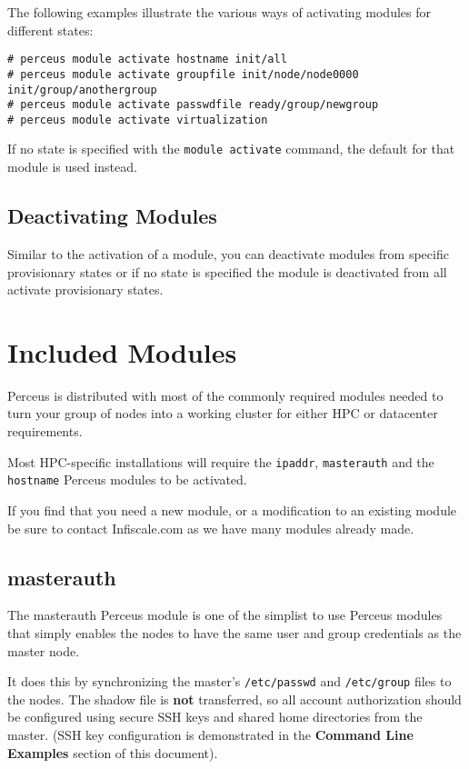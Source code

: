 \documentclass[10pt,letterpaper]{report}
\begin{document}
The following examples illustrate the various ways of activating modules for
different states:

\begin{verbatim}
# perceus module activate hostname init/all
# perceus module activate groupfile init/node/node0000 init/group/anothergroup
# perceus module activate passwdfile ready/group/newgroup
# perceus module activate virtualization
\end{verbatim}

If no state is specified with the {\tt module activate} command, the default
for that module is used instead.

\subsection{Deactivating Modules}

Similar to the activation of a module, you can deactivate modules from
specific provisionary states or if no state is specified the module is
deactivated from all activate provisionary states.


\section{Included Modules}

Perceus is distributed with most of the commonly required modules needed to
turn your group of nodes into a working cluster for either HPC or datacenter
requirements.

Most HPC-specific installations will require the {\tt ipaddr}, {\tt masterauth}
and the {\tt hostname} Perceus modules to be activated.

If you find that you need a new module, or a modification to an existing
module be sure to contact Infiscale.com as we have many modules already made.

\subsection{masterauth}

The masterauth Perceus module is one of the simplist to use Perceus modules
that simply enables the nodes to have the same user and group credentials as
the master node.

It does this by synchronizing the master's {\tt /etc/passwd} and
{\tt /etc/group} files to the nodes.  The shadow file is {\bf not}
transferred, so all account authorization should be configured using secure
SSH keys and shared home directories from the master.  (SSH key configuration
is demonstrated in the {\bf Command Line Examples} section of this document).
\end{document}
